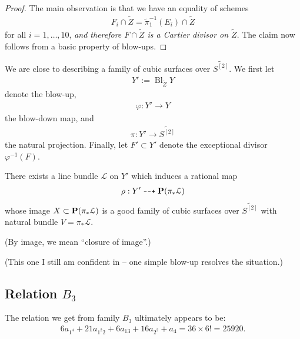 \documentclass[12pt,reqno]{amsart}
\DeclareMathOperator{\Bl}{Bl}
\renewcommand{\to}{{\longrightarrow}}
\numberwithin{equation}{section}
\begin{document}
\begin{proof}
  The main observation is that we have an equality of schemes
  \begin{align}
    \label{eq:Cartier}
    F_i \cap \widetilde{Z} = \widetilde{\pi}_{1}^{-1}(E_i) \cap \widetilde{Z}
  \end{align}
  for all $i=1, \dots, 10$, {\sl and therefore $F \cap \widetilde{Z}$
    is a Cartier divisor on $\widetilde{Z}$}. The claim now follows
  from a basic property of blow-ups.
\end{proof}



We are close to describing a family of cubic surfaces over
$\widetilde{S^{[2]}}$.  We first let
\begin{align}
  \label{eq:XB3}
  Y' := \Bl_{\widetilde{Z}}Y
\end{align}
denote the blow-up,
\begin{align}
  \label{eq:phiB3}
  \varphi: Y' \to Y
\end{align}
the blow-down map, and
\begin{align}
  \label{eq:piB3}
  \pi: Y' \to \widetilde{S^{[2]}}
\end{align}
the natural projection. Finally, let $F' \subset Y'$ denote the
exceptional divisor $\varphi^{-1}(F)$.
\begin{proposition}
  \label{proposition:resolv-b3}
  There exists a line bundle $\mathcal{L}$ on $Y'$ which induces a
  rational map
  \begin{align*}
    \rho: Y' \dashrightarrow \P(\pi_{*}\mathcal{L})
  \end{align*}
  whose image $X \subset \P(\pi_{*}\mathcal{L})$ is a good family of
  cubic surfaces over $\widetilde{S^{[2]}}$ with natural bundle
  $V = \pi_{*} \mathcal{L}$.
\end{proposition}

(By image, we mean ``closure of image''.)

(This one I still am confident in -- one simple blow-up resolves the situation.)


\subsection{Relation $B_3$}
\label{sec:relation-b_3}

The relation we get from family $B_3$ ultimately appears to be:
\begin{align}
  \label{eq:relationB3}
  6a_{1^{4}} + 21a_{1^{2}2}+6a_{13}+16a_{2^{2}}+a_{4} = 36 \times 6! = 25920.
\end{align}
\end{document}
